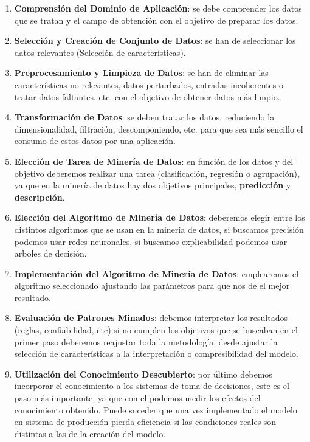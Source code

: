 \begin{enumerate}
  \item \textbf{Comprensión del Dominio de Aplicación}: se debe comprender los datos que se tratan y el campo de obtención con el objetivo de preparar los datos.
  \item \textbf{Selección y Creación de Conjunto de Datos}: se han de seleccionar los datos relevantes (Selección de características).
  \item \textbf{Preprocesamiento y Limpieza de Datos}: se han de eliminar las características no relevantes, datos perturbados, entradas incoherentes o tratar datos faltantes, etc. con el objetivo de obtener datos más limpio.
  \item \textbf{Transformación de Datos}: se deben tratar los datos, reduciendo la dimensionalidad, filtración, descomponiendo, etc. para que sea más sencillo el consumo de estos datos por una aplicación.
  \item \textbf{Elección de Tarea de Minería de Datos}: en función de los datos y del objetivo deberemos realizar una tarea (clasificación, regresión o agrupación), ya que en la minería de datos hay dos objetivos principales, \textbf{predicción} y \textbf{descripción}.
  \item \textbf{Elección del Algoritmo de Minería de Datos}: deberemos elegir entre los distintos algoritmos que se usan en la minería de datos, si buscamos precisión podemos usar redes neuronales, si buscamos explicabilidad podemos usar arboles de decisión.
  \item \textbf{Implementación del Algoritmo de Minería de Datos}: emplearemos el algoritmo seleccionado ajustando las parámetros para que nos de el mejor resultado.
  \item \textbf{Evaluación de Patrones Minados}: debemos interpretar los resultados (reglas, confiabilidad, etc) si no cumplen los objetivos que se buscaban en el primer paso deberemos reajustar toda la metodología, desde ajustar la selección de características a la interpretación o compresibilidad del modelo.
  \item \textbf{Utilización del Conocimiento Descubierto}: por último debemos incorporar el conocimiento a los sistemas de toma de decisiones, este es el paso más importante, ya que con el podemos medir los efectos del conocimiento obtenido. Puede suceder que una vez implementado el modelo en sistema de producción pierda eficiencia si las condiciones reales son distintas a las de la creación del modelo.
\end{enumerate}


